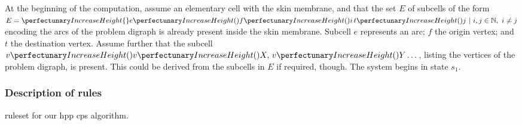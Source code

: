 At the beginning of the computation, assume an elementary cell with the skin membrane, and that the set \(E\) of subcells of the form \(E = \cpset{\cpfunc{e}{\cpfunc{f}{i} \, \cpfunc{t}{j}} ~ | ~ i,j \in \mathbb{N}, ~ i \neq j}\) encoding the arcs of the problem digraph is already present inside the skin membrane.  Subcell \(e\) represents an arc; \(f\) the origin vertex; and \(t\) the destination vertex.  Assume further that the subcell \(\cpfunc{v}{\cpfunc{v}{X}, \, \cpfunc{v}{Y} \dots}\), listing the vertices of the problem digraph, is present.  This could be derived from the subcells in \(E\) if required, though.  The system begins in state \(s_1\).

\subsubsection{\label{sec:tsp:hpprules}Description of rules}

\begin{cprulesetfloat}
    \begin{cpruleset}
        
        
        
    \end{cpruleset}
    \caption[\Gls{ruleset} for the ]{\label{ruleset:tsp:hpp}\Gls{ruleset} for our \gls{hpp} \gls{cps} algorithm.}
\end{cprulesetfloat}

